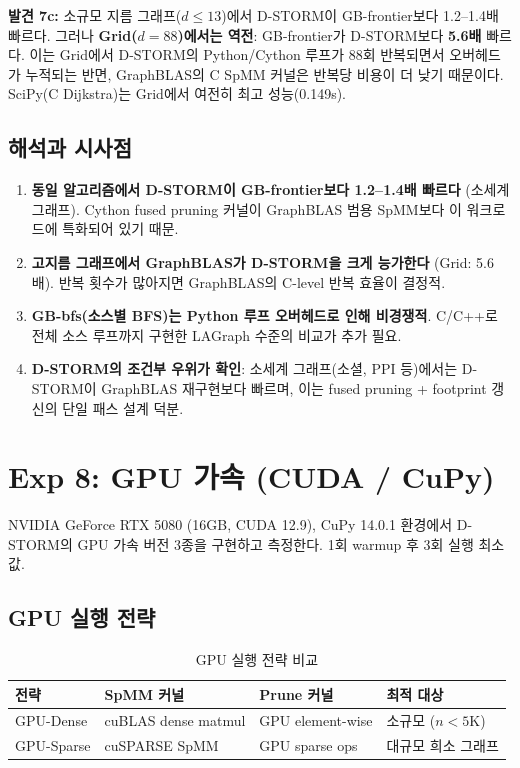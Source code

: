 \documentclass[11pt,a4paper]{article}
\begin{document}
\textbf{발견 7c:} 소규모 지름 그래프($d \leq 13$)에서 D-STORM이 GB-frontier보다 1.2--1.4배 빠르다. 그러나 \textbf{Grid($d=88$)에서는 역전}: GB-frontier가 D-STORM보다 \textbf{5.6배} 빠르다. 이는 Grid에서 D-STORM의 Python/Cython 루프가 88회 반복되면서 오버헤드가 누적되는 반면, GraphBLAS의 C SpMM 커널은 반복당 비용이 더 낮기 때문이다. SciPy(C Dijkstra)는 Grid에서 여전히 최고 성능(0.149s).

\subsection{해석과 시사점}

\begin{tcolorbox}[colback=blue!5, colframe=blue!50!black, title=GraphBLAS 비교 핵심 결론]
\begin{enumerate}
  \item \textbf{동일 알고리즘에서 D-STORM이 GB-frontier보다 1.2--1.4배 빠르다} (소세계 그래프). Cython fused pruning 커널이 GraphBLAS 범용 SpMM보다 이 워크로드에 특화되어 있기 때문.
  \item \textbf{고지름 그래프에서 GraphBLAS가 D-STORM을 크게 능가한다} (Grid: 5.6배). 반복 횟수가 많아지면 GraphBLAS의 C-level 반복 효율이 결정적.
  \item \textbf{GB-bfs(소스별 BFS)는 Python 루프 오버헤드로 인해 비경쟁적}. C/C++로 전체 소스 루프까지 구현한 LAGraph 수준의 비교가 추가 필요.
  \item \textbf{D-STORM의 조건부 우위가 확인}: 소세계 그래프(소셜, PPI 등)에서는 D-STORM이 GraphBLAS 재구현보다 빠르며, 이는 fused pruning + footprint 갱신의 단일 패스 설계 덕분.
\end{enumerate}
\end{tcolorbox}

\section{Exp 8: GPU 가속 (CUDA / CuPy)}

NVIDIA GeForce RTX 5080 (16GB, CUDA 12.9), CuPy 14.0.1 환경에서 D-STORM의 GPU 가속 버전 3종을 구현하고 측정한다. 1회 warmup 후 3회 실행 최소값.

\subsection{GPU 실행 전략}

\begin{table}[ht]\centering
\caption{GPU 실행 전략 비교}
\small
\begin{tabular}{@{}llll@{}}
\toprule
\textbf{전략} & \textbf{SpMM 커널} & \textbf{Prune 커널} & \textbf{최적 대상} \\
\midrule
GPU-Dense & cuBLAS dense matmul & GPU element-wise & 소규모 ($n < 5$K) \\
GPU-Sparse & cuSPARSE SpMM & GPU sparse ops & 대규모 희소 그래프 \\
\bottomrule
\end{tabular}
\end{table}
\end{document}
